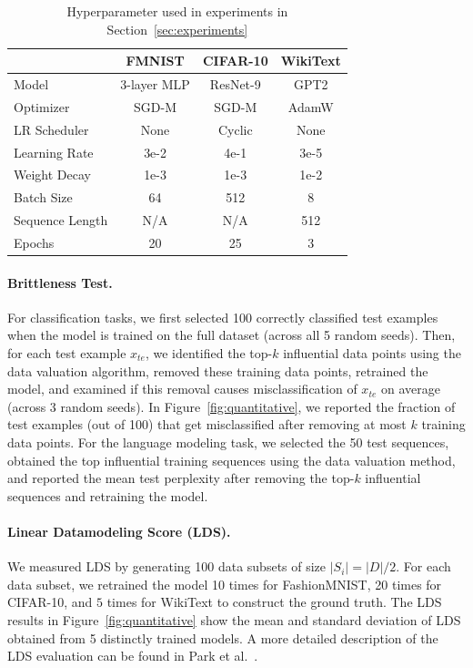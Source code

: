 \begin{table}[htbp]
\centering
\begin{tabularx}{\textwidth}{X*{3}{c}}
\toprule
              & \quad\quad\textbf{FMNIST}\quad\quad\quad      & \quad\quad\textbf{CIFAR-10}\quad\quad\quad & \quad\quad\textbf{WikiText}\quad\quad\quad       \\ \midrule
Model         & 3-layer MLP & ResNet-9 & GPT2      \\[0.3ex]
Optimizer     & SGD-M       & SGD-M    & AdamW     \\[0.3ex]
LR Scheduler  & None        & Cyclic   & None      \\[0.3ex]
Learning Rate & 3e-2        & 4e-1     & 3e-5      \\[0.3ex]
Weight Decay  & 1e-3        & 1e-3     & 1e-2      \\[0.3ex]
Batch Size    & 64          & 512      & 8         \\[0.3ex]
Sequence Length    & N/A          & N/A      & 512         \\[0.3ex]
Epochs        & 20          & 25       & 3         \\ \bottomrule
\end{tabularx}
\vskip 3pt
\caption{Hyperparameter used in experiments in Section~\ref{sec:experiments}}
\label{tab:hyperparams}
\end{table}

\paragraph{Brittleness Test.} For classification tasks, we first selected 100 correctly classified test examples when the model is trained on the full dataset (across all 5 random seeds). Then, for each test example $x_{te}$, we identified the top-$k$ influential data points using the data valuation algorithm, removed these training data points, retrained the model, and examined if this removal causes misclassification of $x_{te}$ on average (across 3 random seeds). In Figure~\ref{fig:quantitative}, we reported the fraction of test examples (out of 100) that get misclassified after removing at most $k$ training data points. For the language modeling task, we selected the 50 test sequences, obtained the top influential training sequences using the data valuation method, and reported the mean test perplexity after removing the top-$k$ influential sequences and retraining the model.

\paragraph{Linear Datamodeling Score (LDS).} We measured LDS by generating 100 data subsets of size $|S_i| = |D| / 2$. For each data subset, we retrained the model 10 times for FashionMNIST, 20 times for CIFAR-10, and $5$ times for WikiText to construct the ground truth. The LDS results in Figure~\ref{fig:quantitative} show the mean and standard deviation of LDS obtained from 5 distinctly trained models. A more detailed description of the LDS evaluation can be found in Park et al.~\cite{park2023trak}.

